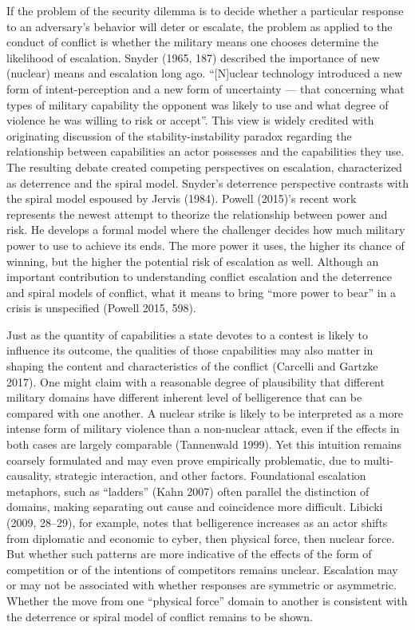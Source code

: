 \documentclass[
]{article}
\begin{document}
If the problem of the security dilemma is to decide whether a particular response to an adversary's behavior will deter or escalate, the problem as applied to the conduct of conflict is whether the military means one chooses determine the likelihood of escalation. Snyder (1965, 187) described the importance of new (nuclear) means and escalation long ago. ``{[}N{]}uclear technology introduced a new form of intent-perception and a new form of uncertainty --- that concerning what types of military capability the opponent was likely to use and what degree of violence he was willing to risk or accept''. This view is widely credited with originating discussion of the stability-instability paradox regarding the relationship between capabilities an actor possesses and the capabilities they use. The resulting debate created competing perspectives on escalation, characterized as deterrence and the spiral model. Snyder's deterrence perspective contrasts with the spiral model espoused by Jervis (1984). Powell (2015)'s recent work represents the newest attempt to theorize the relationship between power and risk. He develops a formal model where the challenger decides how much military power to use to achieve its ends. The more power it uses, the higher its chance of winning, but the higher the potential risk of escalation as well. Although an important contribution to understanding conflict escalation and the deterrence and spiral models of conflict, what it means to bring ``more power to bear'' in a crisis is unspecified (Powell 2015, 598).

Just as the quantity of capabilities a state devotes to a contest is likely to influence its outcome, the qualities of those capabilities may also matter in shaping the content and characteristics of the conflict (Carcelli and Gartzke 2017). One might claim with a reasonable degree of plausibility that different military domains have different inherent level of belligerence that can be compared with one another. A nuclear strike is likely to be interpreted as a more intense form of military violence than a non-nuclear attack, even if the effects in both cases are largely comparable (Tannenwald 1999). Yet this intuition remains coarsely formulated and may even prove empirically problematic, due to multi-causality, strategic interaction, and other factors. Foundational escalation metaphors, such as ``ladders'' (Kahn 2007) often parallel the distinction of domains, making separating out cause and coincidence more difficult. Libicki (2009, 28--29), for example, notes that belligerence increases as an actor shifts from diplomatic and economic to cyber, then physical force, then nuclear force. But whether such patterns are more indicative of the effects of the form of competition or of the intentions of competitors remains unclear. Escalation may or may not be associated with whether responses are symmetric or asymmetric. Whether the move from one ``physical force'' domain to another is consistent with the deterrence or spiral model of conflict remains to be shown.
\end{document}
